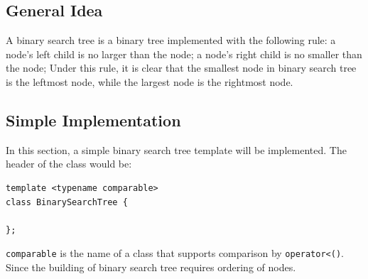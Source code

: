 \documentclass[12pt]{book}
\begin{document}
\subsection{General Idea}
\label{sec:orgd0564e9}
A binary search tree is a binary tree implemented with the following rule: a node's left child is no larger than the node; a node's right child is no smaller than the node; Under this rule, it is clear that the smallest node in binary search tree is the leftmost node, while the largest node is the rightmost node.
\subsection{Simple Implementation}
\label{sec:orgecb0a3a}
In this section, a simple binary search tree template will be implemented. The header of the class would be:
\begin{verbatim}
template <typename comparable>
class BinarySearchTree {

};
\end{verbatim}
\texttt{comparable} is the name of a class that supports comparison by \texttt{operator<()}. Since the building of binary search tree requires ordering of nodes.
\end{document}
